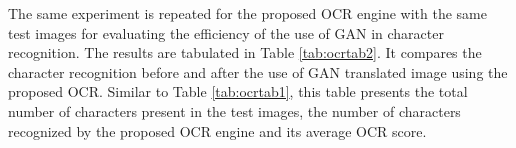The same experiment is repeated for the proposed OCR engine with the same test images for evaluating the efficiency of the use of GAN in character recognition. The results are tabulated in Table \ref{tab:ocrtab2}. It compares the character recognition before and after the use of GAN translated image using the proposed OCR. Similar to Table \ref{tab:ocrtab1}, this table presents the total number of characters present in the test images, the number of characters recognized by the proposed OCR engine and its average OCR score.
\begin{table}[H]
\caption{Character recognition with and without GAN using the proposed OCR engine}
\label{tab:ocrtab2}
\end{table}

